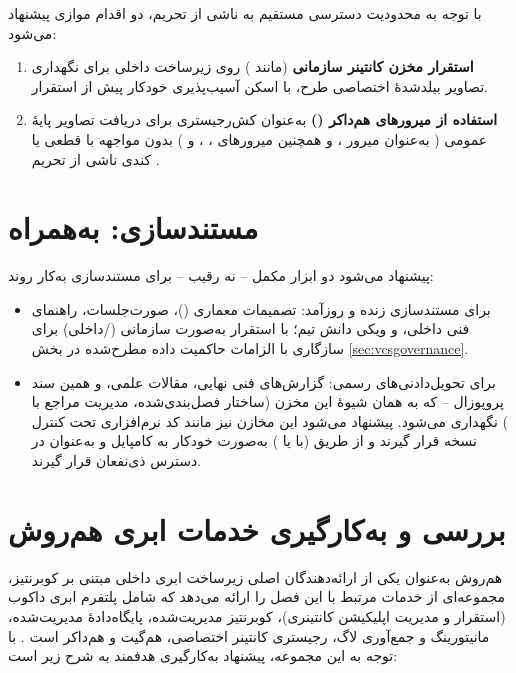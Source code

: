 با توجه به محدودیت دسترسی مستقیم به  ناشی از تحریم، دو اقدام موازی پیشنهاد می‌شود:

\begin{enumerate}
\item \textbf{استقرار مخزن کانتینر سازمانی} (مانند ) روی زیرساخت داخلی برای نگهداری تصاویر بیلدشدهٔ اختصاصی طرح، با اسکن آسیب‌پذیری خودکار پیش از استقرار.
\item \textbf{استفاده از میرورهای هم‌داکر ()} به‌عنوان کش‌رجیستری برای دریافت تصاویر پایهٔ عمومی ( به‌عنوان میرور ، و همچنین میرورهای ، ،  و ) بدون مواجهه با قطعی یا کندی ناشی از تحریم \Cite{hamdocker2026}.
\end{enumerate}

\section{مستندسازی:  به‌همراه }

پیشنهاد می‌شود دو ابزار مکمل -- نه رقیب -- برای مستندسازی به‌کار روند:

\begin{itemize}
\item \textbf{} برای مستندسازی زنده و روزآمد: تصمیمات معماری ()، صورت‌جلسات، راهنمای فنی داخلی، و ویکی دانش تیم؛ با استقرار به‌صورت سازمانی (/داخلی) برای سازگاری با الزامات حاکمیت داده مطرح‌شده در بخش \ref{sec:vcsgovernance}.
\item \textbf{} برای تحویل‌دادنی‌های رسمی: گزارش‌های فنی نهایی، مقالات علمی، و همین سند پروپوزال -- که به همان شیوهٔ این مخزن (ساختار فصل‌بندی‌شده، مدیریت مراجع با ) نگهداری می‌شود. پیشنهاد می‌شود این مخازن  نیز مانند کد نرم‌افزاری تحت کنترل نسخه قرار گیرند و از طریق  (با  یا ) به‌صورت خودکار به  کامپایل و به‌عنوان  در دسترس ذی‌نفعان قرار گیرند.
\end{itemize}

\section{بررسی و به‌کارگیری خدمات ابری هم‌روش}

هم‌روش به‌عنوان یکی از ارائه‌دهندگان اصلی زیرساخت ابری داخلی مبتنی بر کوبرنتیز، مجموعه‌ای از خدمات مرتبط با این فصل را ارائه می‌دهد که شامل پلتفرم ابری داکوب (استقرار و مدیریت اپلیکیشن کانتینری)، کوبرنتیز مدیریت‌شده، پایگاه‌دادهٔ مدیریت‌شده، مانیتورینگ و جمع‌آوری لاگ، رجیستری کانتینر اختصاصی، هم‌گیت و هم‌داکر است \Cite{hamravesh2026}. با توجه به این مجموعه، پیشنهاد به‌کارگیری هدفمند به شرح زیر است:


